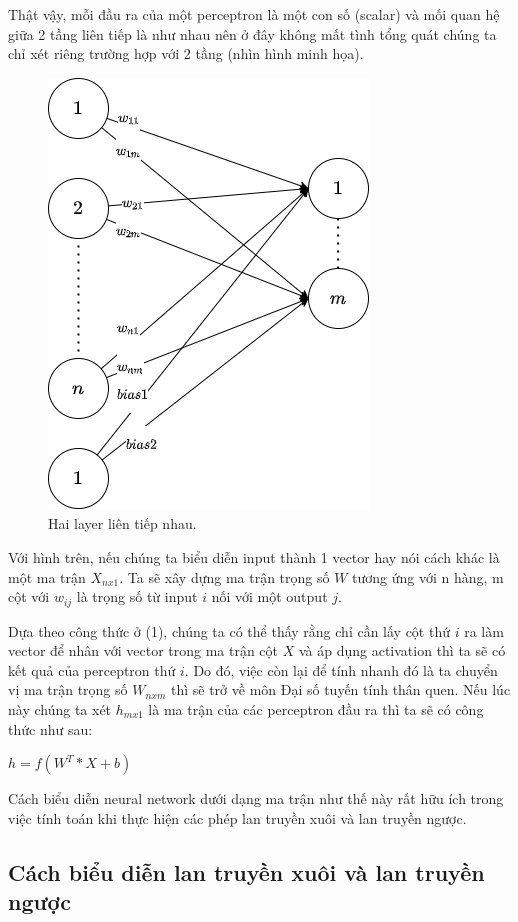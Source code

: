Thật vậy, mỗi đầu ra của một perceptron là một con số (scalar) và mối quan hệ giữa 2 tầng liên tiếp là như nhau nên ở đây không mất tình tổng quát chúng ta chỉ xét riêng trường hợp với 2 tầng (nhìn hình minh họa).
\begin{figure}[!h]
	\centering
		\includegraphics[width=0.5\columnwidth]{chapter03/figure/FC.png}
        \caption{Hai layer liên tiếp nhau.}
        \label{fig:FC}
		\centering
\end{figure}

Với hình trên, nếu chúng ta biểu diễn input thành 1 vector hay nói cách khác là một ma trận $X_{nx1}$. Ta sẽ xây dựng ma trận trọng số $W$ tương ứng với n hàng, m cột với $w_{ij}$ là trọng số từ input $i$ nối với một output $j$.

Dựa theo công thức ở (1), chúng ta có thể thấy rằng chỉ cần lấy cột thứ $i$ ra làm vector để nhân với vector trong ma trận cột $X$ và áp dụng activation thì ta sẽ có kết quả của perceptron thứ $i$. Do đó, việc còn lại để tính nhanh đó là ta chuyển vị ma trận trọng số $W_{nxm}$ thì sẽ trở về môn Đại số tuyến tính thân quen. Nếu lúc này chúng ta xét $h_{mx1}$ là ma trận của các perceptron đầu ra thì ta sẽ có công thức như sau:
\begin{center}
    $h = f(W^{T}*X+b)$
\end{center}

Cách biểu diễn neural network dưới dạng ma trận như thế này rất hữu ích trong việc tính toán khi thực hiện các phép lan truyền xuôi và lan truyền ngược.

\subsection{Cách biểu diễn lan truyền xuôi và lan truyền ngược}
